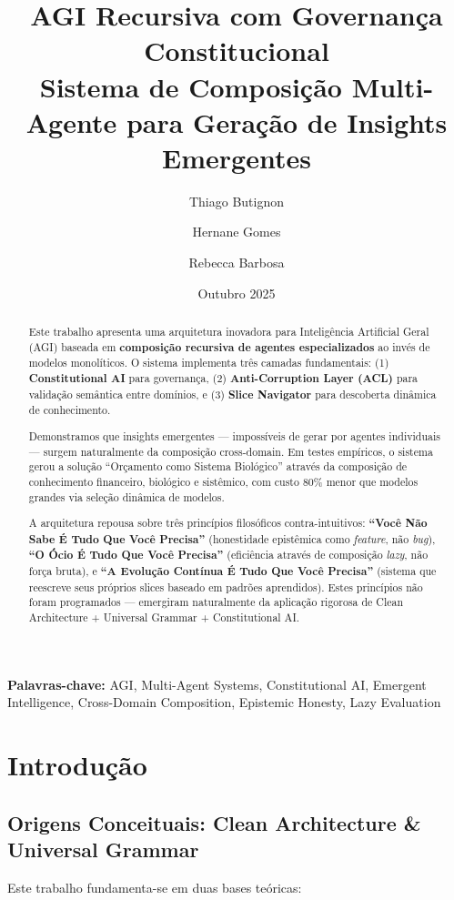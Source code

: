 \documentclass[11pt]{article}
\title{\textbf{AGI Recursiva com Governança Constitucional}\\
\large Sistema de Composição Multi-Agente para Geração de Insights Emergentes}
\author{
    Thiago Butignon
    \and
    Hernane Gomes
    \and
    Rebecca Barbosa
}
\date{Outubro 2025}
\begin{document}
\maketitle

\begin{abstract}
Este trabalho apresenta uma arquitetura inovadora para Inteligência Artificial Geral (AGI) baseada em \textbf{composição recursiva de agentes especializados} ao invés de modelos monolíticos. O sistema implementa três camadas fundamentais: (1) \textbf{Constitutional AI} para governança, (2) \textbf{Anti-Corruption Layer (ACL)} para validação semântica entre domínios, e (3) \textbf{Slice Navigator} para descoberta dinâmica de conhecimento.

Demonstramos que insights emergentes --- impossíveis de gerar por agentes individuais --- surgem naturalmente da composição cross-domain. Em testes empíricos, o sistema gerou a solução ``Orçamento como Sistema Biológico'' através da composição de conhecimento financeiro, biológico e sistêmico, com custo 80\% menor que modelos grandes via seleção dinâmica de modelos.

A arquitetura repousa sobre três princípios filosóficos contra-intuitivos: \textbf{``Você Não Sabe É Tudo Que Você Precisa''} (honestidade epistêmica como \textit{feature}, não \textit{bug}), \textbf{``O Ócio É Tudo Que Você Precisa''} (eficiência através de composição \textit{lazy}, não força bruta), e \textbf{``A Evolução Contínua É Tudo Que Você Precisa''} (sistema que reescreve seus próprios slices baseado em padrões aprendidos). Estes princípios não foram programados --- emergiram naturalmente da aplicação rigorosa de Clean Architecture + Universal Grammar + Constitutional AI.
\end{abstract}

\noindent\textbf{Palavras-chave:} AGI, Multi-Agent Systems, Constitutional AI, Emergent Intelligence, Cross-Domain Composition, Epistemic Honesty, Lazy Evaluation

\section{Introdução}

\subsection{Origens Conceituais: Clean Architecture \& Universal Grammar}

Este trabalho fundamenta-se em duas bases teóricas:
\end{document}
